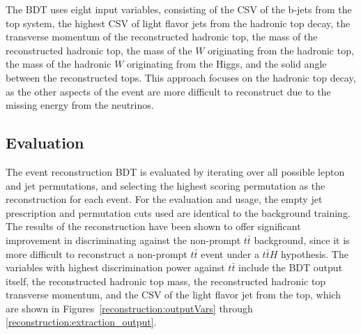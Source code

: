 The BDT uses eight input variables, consisting of the CSV of the b-jets from the top
system, the highest CSV of light flavor jets from the hadronic top decay, the transverse
momentum of the reconstructed hadronic top, the mass of the reconstructed hadronic top,
the mass of the $W$ originating from the hadronic top, the mass of the hadronic $W$
originating from the Higgs, and the solid angle between the reconstructed tops.
This approach focuses on the hadronic top decay, as the other aspects of the event
are more difficult to reconstruct due to the missing energy from the neutrinos. 

\subsection{Evaluation}

The event reconstruction BDT is evaluated by iterating over all possible lepton and jet
permutations, and selecting the highest scoring permutation as the reconstruction for
each event. For the evaluation and usage, the empty jet prescription and permutation
cuts used are identical to the background training. The results of the reconstruction
have been shown to offer significant improvement in discriminating against the non-prompt
$t\bar{t}$ background, since it is more difficult to reconstruct a non-prompt $t\bar{t}$ event
under a $t\bar{t}H$ hypothesis. The variables with highest discrimination power against $t\bar{t}$
include the BDT output itself, the reconstructed hadronic top mass, the reconstructed hadronic top
transverse momentum, and the CSV of the light flavor jet from the top, which are shown in
Figures~\ref{reconstruction:outputVars} through \ref{reconstruction:extraction_output}.

